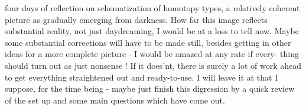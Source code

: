    four days of reflection on schematization of homotopy
types,   a relatively coherent picture as gradually  emerging from
darkness.  How far this image reflects substantial reality,  not just
daydreaming,  I would be at a loss to tell now.  Maybe some substantial
corrections will have to be made still,  besides getting in other ideas
for a more complete picture  -  I would be amazed at any rate if every-%
thing should turn out as just nonsense !  If it does'nt,  there is surely
a lot of work ahead to get everything straightened out and ready-to-use.
I will leave it at that I suppose,  for the time being  -  maybe just
finish this digression by a quick review of the set up\hand{,} and  some main
questions which have come out.

